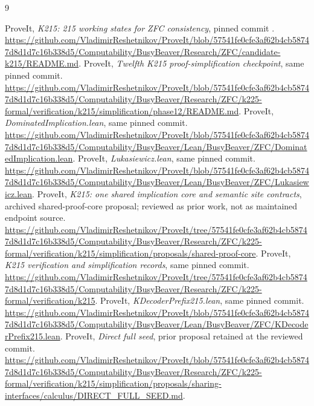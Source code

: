 \documentclass[11pt,letterpaper]{article}
\newcommand{\code}[1]{\texttt{\small\detokenize{#1}}}
\begin{document}
\begin{thebibliography}{9}\small\raggedright
{}
ProveIt, \emph{K215: 215 working states for ZFC consistency}, pinned commit
\code{57541fe0cfe3af62b4cb58747d8d1d7c16b338d5}.
\url{https://github.com/VladimirReshetnikov/ProveIt/blob/57541fe0cfe3af62b4cb58747d8d1d7c16b338d5/Computability/BusyBeaver/Research/ZFC/candidate-k215/README.md}.
ProveIt, \emph{Twelfth K215 proof-simplification checkpoint}, same pinned commit.
\url{https://github.com/VladimirReshetnikov/ProveIt/blob/57541fe0cfe3af62b4cb58747d8d1d7c16b338d5/Computability/BusyBeaver/Research/ZFC/k225-formal/verification/k215/simplification/phase12/README.md}.
ProveIt, \emph{DominatedImplication.lean}, same pinned commit.
\url{https://github.com/VladimirReshetnikov/ProveIt/blob/57541fe0cfe3af62b4cb58747d8d1d7c16b338d5/Computability/BusyBeaver/Lean/BusyBeaver/ZFC/DominatedImplication.lean}.
ProveIt, \emph{Lukasiewicz.lean}, same pinned commit.
\url{https://github.com/VladimirReshetnikov/ProveIt/blob/57541fe0cfe3af62b4cb58747d8d1d7c16b338d5/Computability/BusyBeaver/Lean/BusyBeaver/ZFC/Lukasiewicz.lean}.
ProveIt, \emph{K215: one shared implication core and semantic site contracts},
archived shared-proof-core proposal; reviewed as prior work, not as maintained
endpoint source.
\url{https://github.com/VladimirReshetnikov/ProveIt/tree/57541fe0cfe3af62b4cb58747d8d1d7c16b338d5/Computability/BusyBeaver/Research/ZFC/k225-formal/verification/k215/simplification/proposals/shared-proof-core}.
ProveIt, \emph{K215 verification and simplification records}, same pinned commit.
\url{https://github.com/VladimirReshetnikov/ProveIt/tree/57541fe0cfe3af62b4cb58747d8d1d7c16b338d5/Computability/BusyBeaver/Research/ZFC/k225-formal/verification/k215}.
ProveIt, \emph{KDecoderPrefix215.lean}, same pinned commit.
\url{https://github.com/VladimirReshetnikov/ProveIt/blob/57541fe0cfe3af62b4cb58747d8d1d7c16b338d5/Computability/BusyBeaver/Lean/BusyBeaver/ZFC/KDecoderPrefix215.lean}.
ProveIt, \emph{Direct full seed}, prior proposal retained at the reviewed commit.
\url{https://github.com/VladimirReshetnikov/ProveIt/blob/57541fe0cfe3af62b4cb58747d8d1d7c16b338d5/Computability/BusyBeaver/Research/ZFC/k225-formal/verification/k215/simplification/proposals/sharing-interfaces/calculus/DIRECT_FULL_SEED.md}.
\end{thebibliography}
\end{document}
